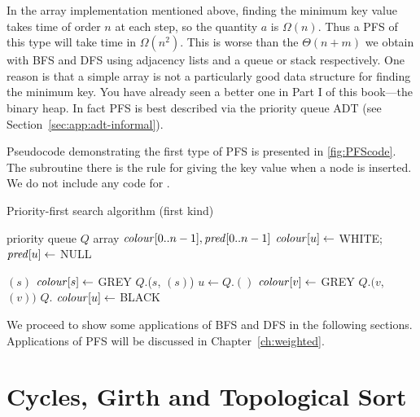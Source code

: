 In the array implementation mentioned above, finding the minimum key
value takes time of order $n$ at each step, so the quantity $a$ is
$\Omega(n)$. Thus a PFS of this type will take time in $\Omega(n^2)$.
This is worse than the $\Theta(n+m)$ we obtain with BFS and DFS using
adjacency lists and a queue or stack respectively. One reason is that a
simple array is not a particularly good data structure for finding the
minimum key. You have already seen a better one in Part I of this 
book---the binary heap. In fact PFS is best described via the priority
queue ADT (see Section~\ref{sec:app:adt-informal}).

Pseudocode demonstrating the first type of PFS is presented in
\cref{fig:PFScode}. The subroutine  there is the
rule for giving the key value when a node is inserted. We do not include
any code for .

\begin{algorithm}[H]
  \caption{Priority-first search algorithm (first kind)}
  \label{fig:PFScode}
\begin{algorithmic}[1]
	\State priority queue $Q$  
	\State array $\operatorname{\text{\textit{colour}}}[0..n-1], \operatorname{\text{\textit{pred}}}[0..n-1]$
		\State $\operatorname{\text{\textit{colour}}}[u] \gets $ WHITE; $\operatorname{\text{\textit{pred}}}[u] \gets $ NULL
	\EndFor
	
			\State {}$(s)$
		\EndIf
	\EndFor
	\State \Return{$\pred$}
\EndFunction
{}
	\State $\operatorname{\text{\textit{colour}}}[s] \gets $ GREY 
	\State $Q$.($s$, $(s)$)
		\State $u \gets Q$.$()$
			\State $\operatorname{\text{\textit{colour}}}[v] \gets $ GREY
			\State $Q$.$(v$,  $(v))$
		\Else
			\State $Q$.
			\State $\operatorname{\text{\textit{colour}}}[u] \gets$ BLACK
		\EndIf
	\EndWhile
\EndFunction
\end{algorithmic}
\end{algorithm}


We proceed to show some applications of BFS and DFS in the following
sections. Applications of PFS will be discussed in
Chapter~\ref{ch:weighted}.

\chapter{Cycles, Girth and Topological Sort}


